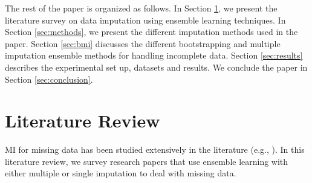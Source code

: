 \documentclass{iosart2c}
\begin{document}
The rest of the paper is organized as follows. In Section \ref{sec:litrev}, we present the literature survey on data imputation using ensemble learning techniques. In Section \ref{sec:methods}, we present the different imputation methods used in the paper. Section \ref{sec:bmi} discusses the different bootstrapping and multiple imputation ensemble methods for handling incomplete data. Section \ref{sec:results} describes the experimental set up, datasets and results. We conclude the paper in Section \ref{sec:conclusion}.

\section{Literature Review}
\label{sec:litrev}
MI for missing data has been studied extensively in the literature (e.g., \cite{horton2001multiple, Donders2006Review, Harel2007Multiple}). In this literature review, we survey research papers that use ensemble learning with either multiple or single imputation to deal with missing data.
\end{document}
